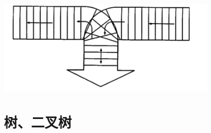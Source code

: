 \documentclass[lang=cn,newtx,10pt,scheme=chinese]{../../elegantbook}
\begin{document}
\begin{enumerate}
    \includegraphics[width=4.375in,height=1.88958in]{./images/image2.png}

  \end{enumerate}
  \chapter{树、二叉树}
\end{document}
